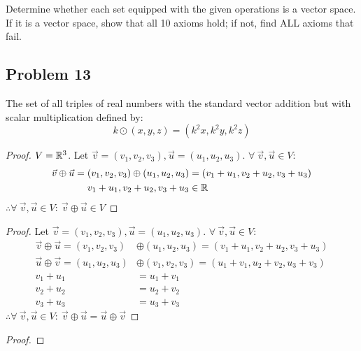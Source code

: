 




Determine whether each set equipped with the given operations is a vector space.
If it is a vector space, show that all 10 axioms hold; if not, find ALL axioms that fail.

\subsection*{Problem 13}
The set of all triples of real numbers with the standard vector addition but with scalar multiplication defined by:
\[
  k \odot (x,y,z) = (k^2x,k^2y,k^2z)
\]
\begin{enumerate}
  \begin{proof}
    $V = \mathbb{R}^3$. Let $\vec{v}=(v_1,v_2,v_3),\vec{u}=(u_1,u_2,u_3)$. $\forall~\vec{v},\vec{u} \in V$:
    \begin{align*}
      \vec{v} \oplus \vec{u} = (v_1,v_2,v_3) \oplus (u_1,u_2,u_3) & = (v_1+u_1,v_2+u_2,v_3+u_3) \\
      v_1+u_1,v_2+u_2,v_3+u_3                                     & \in \mathbb{R}                  \\
    \end{align*}
    $\therefore \forall~\vec{v},\vec{u} \in V:~\vec{v} \oplus \vec{u} \in V$
  \end{proof}
  \begin{proof}
    Let $\vec{v}=(v_1,v_2,v_3),\vec{u}=(u_1,u_2,u_3)$. $\forall~\vec{v},\vec{u} \in V$:
    \begin{align*}
      \vec{v} \oplus \vec{u} = (v_1,v_2,v_3) & \oplus (u_1,u_2,u_3) = (v_1+u_1,v_2+u_2,v_3+u_3) \\
      \vec{u} \oplus \vec{v} = (u_1,u_2,u_3) & \oplus (v_1,v_2,v_3) = (u_1+v_1,u_2+v_2,u_3+v_3) \\
      v_1+u_1                                & = u_1+v_1                                        \\
      v_2+u_2                                & = u_2+v_2                                        \\
      v_3+u_3                                & = u_3+v_3
    \end{align*}
    $\therefore \forall~\vec{v},\vec{u} \in V:~\vec{v} \oplus \vec{u} = \vec{u} \oplus \vec{v}$
  \end{proof}
  \begin{proof}

\end{proof}
\end{enumerate}

